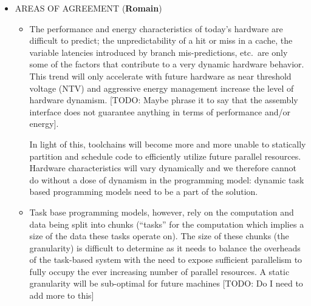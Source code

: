 \begin{itemize}
	\item AREAS OF AGREEMENT (\textbf{Romain})
          \begin{itemize}
          \item{
              The performance and energy characteristics of today's
hardware are difficult to predict; the unpredictability of a hit or
miss in a cache, the variable latencies introduced by branch
mis-predictions, etc.\ are only some of the factors that contribute to
a very dynamic hardware behavior. This trend will only accelerate with
future hardware as near threshold voltage (NTV) and aggressive energy
management increase the level of hardware dynamism. [TODO: Maybe
phrase it to say that the assembly interface does not guarantee
anything in terms of performance and/or energy].

              In light of this, toolchains will become more and more
unable to statically partition and schedule code to efficiently
utilize future parallel resources. Hardware characteristics will vary
dynamically and we therefore cannot do without a dose of dynamism in
the programming model: dynamic task based programming models need to
be a part of the solution.
            }
          \item{
              Task base programming models, however, rely on the
computation and data being split into chunks (``tasks'' for the
computation which implies a size of the data these tasks operate
on). The size of these chunks (the granularity) is difficult to
determine as it needs to balance the overheads of the task-based
system with the need to expose sufficient parallelism to fully occupy
the ever increasing number of parallel resources. A static granularity
will be sub-optimal for future machines [TODO: Do I need to add more
to this]
            }
          \end{itemize}




\end{itemize}
